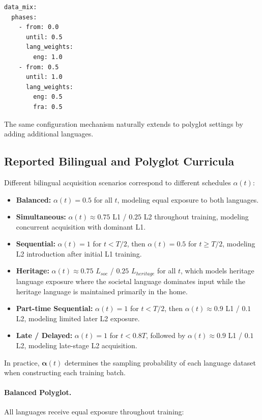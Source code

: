 \begin{verbatim}
data_mix:
  phases:
    - from: 0.0
      until: 0.5
      lang_weights:
        eng: 1.0
    - from: 0.5
      until: 1.0
      lang_weights:
        eng: 0.5
        fra: 0.5
\end{verbatim}


The same configuration mechanism naturally extends to polyglot settings by adding additional languages.


\subsection{Reported Bilingual and Polyglot Curricula}


Different bilingual acquisition scenarios correspond to different schedules $\alpha(t)$:

\begin{itemize}
    \item \textbf{Balanced:} $\alpha(t)=0.5$ for all $t$, modeling equal exposure to both languages.
    \item \textbf{Simultaneous:} $\alpha(t)\approx0.75$ L1 / $0.25$ L2 throughout training, modeling concurrent acquisition with dominant L1.
    \item \textbf{Sequential:} $\alpha(t)=1$ for $t<T/2$, then $\alpha(t)=0.5$ for $t\ge T/2$, modeling L2 introduction after initial L1 training.
    \item \textbf{Heritage:} $\alpha(t)\approx0.75$ $L_{soc}$ / $0.25$ $L_{heritage}$  for all $t$, which models heritage language exposure where the societal language dominates input while the heritage language is maintained primarily in the home.
    \item \textbf{Part-time Sequential:} $\alpha(t)=1$ for $t<T/2$, then $\alpha(t)\approx0.9$ L1 / $0.1$ L2, modeling limited later L2 exposure.
    \item \textbf{Late / Delayed:} $\alpha(t)=1$ for $t<0.8T$, followed by $\alpha(t)\approx0.9$ L1 / $0.1$ L2, modeling late-stage L2 acquisition.
\end{itemize}

In practice, $\boldsymbol{\alpha}(t)$ determines the sampling probability of each language dataset when constructing each training batch. 

\paragraph{Balanced Polyglot.}
All languages receive equal exposure throughout training:

